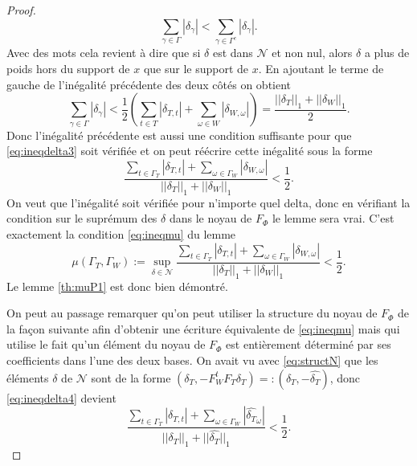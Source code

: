 \begin{proof}
		\begin{equation}\label{eq:ineqdelta}
			\sum_{\gamma \in \Gamma} |\delta_\gamma| < \sum_{\gamma \in \Gamma^c} |\delta_\gamma|. 
		\end{equation}
		Avec des mots cela revient à dire que si $\delta$ est dans $\mathcal{N}$ et non nul, alors $\delta$ a plus de poids hors du support de $x$ que sur le support de $x$.
		En ajoutant le terme de gauche de l'inégalité précédente des deux côtés on obtient
		\begin{equation}
			\sum_{\gamma \in \Gamma} |\delta_\gamma| < \frac{1}{2} \left(\sum_{t \in T} |\delta_{T, t}| + \sum_{\omega \in W} |\delta_{W, \omega}|\right) = \frac{||\delta_T||_1 + ||\delta_W||_1}{2}.
		\end{equation}
		Donc l'inégalité précédente est aussi une condition suffisante pour que \ref{eq:ineqdelta3} soit vérifiée et on peut réécrire cette inégalité sous la forme
		\begin{equation}\label{eq:ineqdelta4}
			\frac{\sum_{t \in \Gamma_T} |\delta_{T,t}| + \sum_{\omega \in \Gamma_W} |\delta_{W,\omega}|  }{||\delta_T||_1 + ||\delta_W||_1 } < \frac{1}{2}.
		\end{equation}
		On veut que l'inégalité soit vérifiée pour n'importe quel delta, donc en vérifiant la condition sur le suprémum des $\delta$ dans le noyau de $F_\Phi$ le lemme sera vrai.
		C'est exactement la condition \ref{eq:ineqmu} du lemme
		\begin{equation}
			\mu(\Gamma_T, \Gamma_W) := \sup_{\delta \in \mathcal{N}} \frac{\sum_{t \in \Gamma_T} |\delta_{T,t}| + \sum_{\omega \in \Gamma_W} |\delta_{W,\omega}|  }{||\delta_T||_1 + ||\delta_W||_1 } < \frac{1}{2}.
		\end{equation}
		Le lemme \ref{th:muP1} est donc bien démontré.
		
		
		On peut au passage remarquer qu'on peut utiliser la structure du noyau de $F_\Phi$ de la façon suivante afin d'obtenir une écriture équivalente de \ref{eq:ineqmu} mais qui utilise le fait qu'un élément du noyau de $F_\Phi$ est entièrement déterminé par ses coefficients dans l'une des deux bases.
		On avait vu avec \ref{eq:structN} que les éléments $\delta$ de $\mathcal{N}$ sont de la forme $(\delta_T, -F_W^t F_T \delta_T) =: (\delta_T, -\widehat{\delta_T})$, donc \ref{eq:ineqdelta4} devient
		\begin{equation}
			\frac{\sum_{t\in \Gamma_T} |\delta_{T, t}| + \sum_{\omega \in \Gamma_W} |\widehat{\delta_T}_\omega|}{||\delta_T||_1 + ||\widehat{\delta_T}||_1} < \frac{1}{2}.
		\end{equation}
	\end{proof}	
